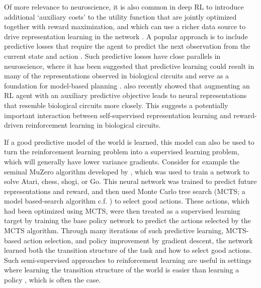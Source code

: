 Of more relevance to neuroscience, it is also common in deep RL to introduce additional `auxiliary costs' to the utility function that are jointly optimized together with reward maximization, and which can use a richer data source to drive representation learning in the network \citep{jaderberg2016reinforcement}.
A popular approach is to include predictive losses that require the agent to predict the next observation from the current state and action \citep{jaderberg2016reinforcement, zintgraf2019varibad}.
Such predictive losses have close parallels in neuroscience, where it has been suggested that predictive learning could result in many of the representations observed in biological circuits \citep{rao1999predictive, stachenfeld2017hippocampus, whittington2020tolman, blanco2021dopamine} and serve as a foundation for model-based planning \citep{jensen2023recurrent}.
\citet{fang2023predictive} also recently showed that augmenting an RL agent with an auxiliary predictive objective leads to neural representations that resemble biological circuits more closely.
This suggests a potentially important interaction between self-supervised representation learning and reward-driven reinforcement learning in biological circuits.

If a good predictive model of the world is learned, this model can also be used to turn the reinforcement learning problem into a supervised learning problem, which will generally have lower variance gradients.
Consider for example the seminal MuZero algorithm developed by \citet{schrittwieser2020mastering}, which was used to train a network to solve Atari, chess, shogi, or Go.
This neural network was trained to predict future representations and reward, and then used Monte Carlo tree search (MCTS; a model based-search algorithm c.f. ) to select good actions.
These actions, which had been optimized using MCTS, were then treated as a supervised learning target by training the base policy network to predict the actions selected by the MCTS algorithm.
Through many iterations of such predictive learning, MCTS-based action selection, and policy improvement by gradient descent, the network learned both the transition structure of the task and how to select good actions.
Such semi-supervised approaches to reinforcement learning are useful in settings where learning the transition structure of the world is easier than learning a policy \citep{jensen2023recurrent}, which is often the case.

